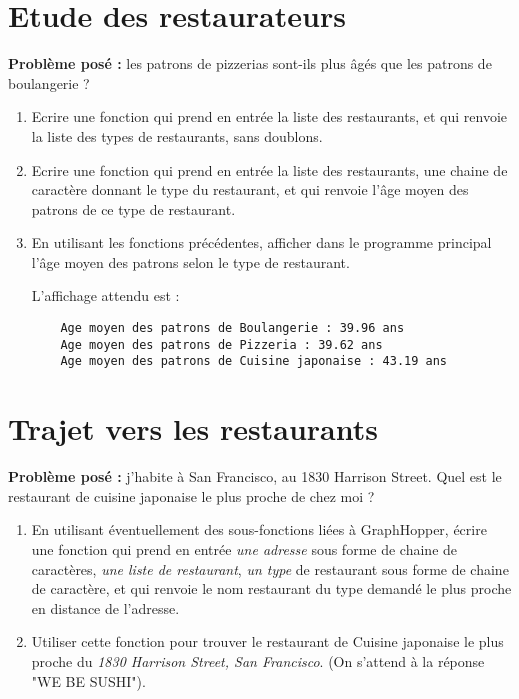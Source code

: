 \documentclass[11pt,a4paper]{article}
\begin{document}
\section{Etude des restaurateurs}

\textbf{Problème posé :} les patrons de pizzerias sont-ils plus âgés que les patrons de boulangerie ? 

\begin{enumerate}
    \item Ecrire une fonction qui prend en entrée la liste des restaurants, et qui renvoie la liste des types de restaurants, sans doublons. 
    \item Ecrire une fonction qui prend en entrée la liste des restaurants, une chaine de caractère donnant le type du restaurant, et qui renvoie l'âge moyen des patrons de ce type de restaurant. 
    \item En utilisant les fonctions précédentes, afficher dans le programme principal l'âge moyen des patrons selon le type de restaurant. 
    
    L'affichage attendu est : 
    \begin{verbatim}
    Age moyen des patrons de Boulangerie : 39.96 ans
    Age moyen des patrons de Pizzeria : 39.62 ans
    Age moyen des patrons de Cuisine japonaise : 43.19 ans
    \end{verbatim}
\end{enumerate}

\section{Trajet vers les restaurants}

\textbf{Problème posé :} j'habite à San Francisco, au 1830 Harrison Street. Quel est le restaurant de cuisine japonaise le plus proche de chez moi ? 

\begin{enumerate}
    \item En utilisant éventuellement des sous-fonctions liées à GraphHopper, écrire une fonction qui prend en entrée \emph{une adresse} sous forme de chaine de caractères, \emph{une liste de restaurant}, \emph{un type} de restaurant sous forme de chaine de caractère, et qui renvoie le nom restaurant du type demandé le plus proche en distance de l'adresse. 
    \item Utiliser cette fonction pour trouver le restaurant de Cuisine japonaise le plus proche du \emph{1830 Harrison Street, San Francisco}. (On s'attend à la réponse "WE BE SUSHI").
\end{enumerate}
\end{document}
